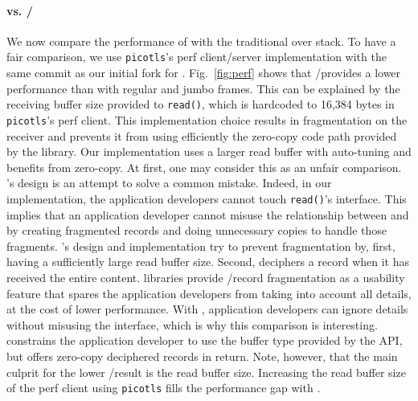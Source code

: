 \paragraph*{\tcpls vs. \tls/\tcp} We now compare the performance of \tcpls with
the traditional \tls over \tcp stack. To have a fair comparison, we use
\texttt{picotls}'s perf client/server implementation with the same commit as our
initial fork for \tcpls. Fig.~\ref{fig:perf} shows that \tls/\tcp provides a
lower performance than \tcpls with regular and jumbo frames. This can be
explained by the receiving buffer size provided to \texttt{read()}, which is
hardcoded to 16,384 bytes in \texttt{picotls}'s perf client. This implementation
choice results in fragmentation on the receiver and prevents it from using
efficiently the
zero-copy code path provided by the library. Our \tcpls implementation uses a
larger read buffer with auto-tuning
and benefits from zero-copy. At first, one may consider this as an unfair
comparison. \tcpls's design is an attempt to solve a common mistake. Indeed, in our \tcpls implementation,
the application developers cannot touch \texttt{read()}'s interface. This
implies that an application developer cannot misuse the relationship between
\tls and \tcp by creating fragmented records and doing unnecessary copies to
handle those fragments. \tcpls's design and implementation try to prevent
fragmentation by, first, having a sufficiently large read buffer size. Second,
\tcpls deciphers a record when it has received the entire content.
\tls libraries provide \tls/\tcp record fragmentation as a usability
feature that spares the application developers from taking into account all \tls
details, at the cost of lower performance. With \tcpls, application developers
can ignore \tls details without misusing the interface, which is why
this comparison is interesting. \tcpls constrains the application developer to
use the buffer type provided by the API, but offers zero-copy deciphered records
in return. Note, however, that the main culprit for the lower \tls/\tcp result
is the read buffer size. Increasing the read buffer size of the perf client
using \texttt{picotls} fills the performance gap with \tcpls.


